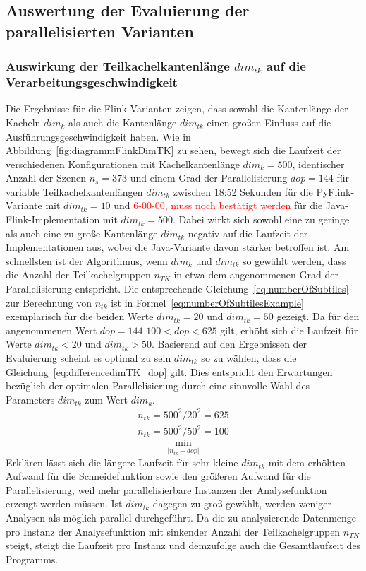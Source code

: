 \subsection{Auswertung der Evaluierung der parallelisierten Varianten}
\subsubsection{Auswirkung der Teilkachelkantenlänge $dim_{tk}$ auf die Verarbeitungsgeschwindigkeit}
Die Ergebnisse für die Flink-Varianten zeigen, dass sowohl die Kantenlänge der Kacheln $dim_{k}$ als auch die Kantenlänge $dim_{tk}$ einen großen Einfluss auf die Ausführungsgeschwindigkeit haben. Wie in Abbildung~\ref{fig:diagrammFlinkDimTK} zu sehen, bewegt sich die Laufzeit der verschiedenen Konfigurationen mit Kachelkantenlänge $dim_k = 500$, identischer Anzahl der Szenen $n_s = 373$ und einem Grad der Parallelisierung $dop = 144$ für variable Teilkachelkantenlängen $dim_{tk}$ zwischen 18:52 Sekunden für die PyFlink-Variante mit $dim_{tk} = 10$ und \textcolor{red}{6-00-00, muss noch bestätigt werden} für die Java-Flink-Implementation mit $dim_{tk} = 500$. Dabei wirkt sich sowohl eine zu geringe als auch eine zu große Kantenlänge $dim_{tk}$ negativ auf die Laufzeit der Implementationen aus, wobei die Java-Variante davon stärker betroffen ist. Am schnellsten ist der Algorithmus, wenn $dim_k$ und $dim_{tk}$ so gewählt werden, dass die Anzahl der Teilkachelgruppen $n_{TK}$ in etwa dem angenommenen Grad der Parallelisierung entspricht. Die entsprechende Gleichung~\ref{eq:numberOfSubtiles} zur Berechnung von $n_{tk}$ ist in Formel~\ref{eq:numberOfSubtilesExample} exemplarisch für die beiden Werte $dim_{tk} = 20$ und $dim_{tk} = 50$ gezeigt. Da für den angenommenen Wert $dop = 144$ $100 < dop < 625$ gilt, erhöht sich die Laufzeit für Werte $dim_{tk} < 20$ und $dim_{tk} > 50$. Basierend auf den Ergebnissen der Evaluierung scheint es optimal zu sein $dim_{tk}$ so zu wählen, dass die Gleichung~\ref{eq:differencedimTK_dop} gilt. Dies entspricht den Erwartungen bezüglich der optimalen Parallelisierung durch eine sinnvolle Wahl des Parameters $dim_{tk}$ zum Wert $dim_k$.
%
\begin{equation}  \label{eq:numberOfSubtilesExample}
	\begin{aligned}
  		n_{tk} = {500^2} / {20^2} = 625\\
  		n_{tk} = {500^2} / {50^2} = 100
	\end{aligned}
\end{equation}
%
\begin{equation}  \label{eq:differencedimTK_dop}
  	 \min_{|n_{tk} - dop|}
\end{equation}
%
Erklären lässt sich die längere Laufzeit für sehr kleine $dim_{tk}$ mit dem erhöhten Aufwand für die Schneidefunktion sowie den größeren Aufwand für die Parallelisierung, weil mehr parallelisierbare Instanzen der Analysefunktion erzeugt werden müssen. Ist $dim_{tk}$ dagegen zu groß gewählt, werden weniger Analysen als möglich parallel durchgeführt. Da die zu analysierende Datenmenge pro Instanz der Analysefunktion mit sinkender Anzahl der Teilkachelgruppen $n_{TK}$ steigt, steigt die Laufzeit pro Instanz und demzufolge auch die Gesamtlaufzeit des Programms. 


